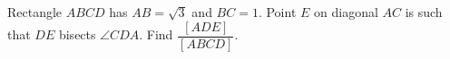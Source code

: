 Rectangle $ABCD$ has $AB=\sqrt3$ and $BC=1$. Point $E$ on diagonal $AC$ is such that $DE$ bisects $\angle CDA$. Find $\dfrac{[ADE]}{[ABCD]}$.
